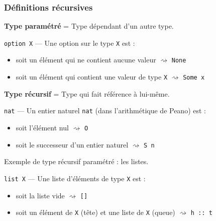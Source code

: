 \documentclass[9pt]{beamer}
\newenvironment{ex}[1][Exemple]{\begin{exampleblock}{#1}}{\end{exampleblock}}
\newcommand{\defi}[1]{\textbf{#1}}
\begin{document}
\begin{frame}
\frametitle{Définitions récursives}

\defi{Type paramétré} = Type dépendant d'un autre type.
\begin{ex}[\texttt{option X} --- Une option sur le type \texttt{X} est :]
\begin{itemize}
  \item soit un élément qui ne contient aucune valeur $\rightsquigarrow$ \texttt{None}
  \item soit un élément qui contient une valeur de type \texttt{X} $\rightsquigarrow$ \texttt{Some x}
\end{itemize}
\end{ex}

\medskip
\defi{Type récursif} = Type qui fait référence à lui-même.
\begin{ex}[\texttt{nat} --- Un entier naturel \texttt{nat} (dans l'arithmétique de Peano) est :]
\begin{itemize}
  \item soit l'élément nul $\rightsquigarrow$ \texttt{O}
  \item soit le successeur d'un entier naturel $\rightsquigarrow$ \texttt{S n}
\end{itemize}
\end{ex}

\medskip
Exemple de type récursif paramétré : les listes.
\begin{ex}[\texttt{list X} --- Une liste d'éléments de type \texttt{X} est :]
\begin{itemize}
  \item soit la liste vide $\rightsquigarrow$ \texttt{[]}
  \item soit un élément de \texttt{X} (tête) et une liste de \texttt{X} (queue) $\rightsquigarrow$ \texttt{h :: t}
\end{itemize}
\end{ex}
\end{frame}
\end{document}
